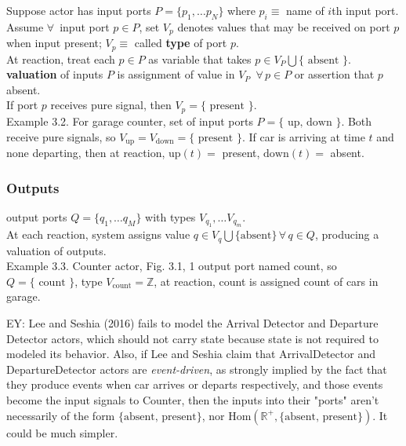 \documentclass[10pt]{amsart}
\begin{document}
\begin{multicols*}{2}
Suppose actor has input ports $P = \lbrace p_1, \dots p_N \rbrace$ where $p_i \equiv $ name of $i$th input port. \\

Assume $\forall \, $ input port $p\in P$, set $V_p$ denotes values that may be received on port $p$ when input present; $V_p \equiv$ called \textbf{type} of port $p$. \\
At reaction, treat each $p \in P$ as variable that takes $p\in V_P \bigcup \lbrace \text{ absent } \rbrace$. \\
\textbf{valuation} of inputs $P$ is assignment of value in $V_P$\, $\forall \, p \in P$ or assertion that $p$ absent. \\
If port $p$ receives pure signal, then $V_p = \lbrace \text{ present } \rbrace$. \\

Example 3.2. For garage counter, set of input ports $P = \lbrace \text{ up, down } \rbrace$. Both receive pure signals, so $V_{\text{up}} = V_{\text{down}} = \lbrace \text{ present } \rbrace$. If car is arriving at time $t$ and none departing, then at reaction, $\text{up}(t) = $ present, $\text{down}(t) = $ absent. \\

\subsubsection{Outputs}

output ports $Q = \lbrace q_1, \dots q_M \rbrace$ with types $V_{q_1}, \dots V_{q_m}$. \\
At each reaction, system assigns value $q\in V_q \bigcup \lbrace \text{absent} \rbrace \, \forall \, q \in Q$, producing a valuation of outputs. \\

Example 3.3. Counter actor, Fig. 3.1, 1 output port named count, so $Q = \lbrace \text{ count } \rbrace$, type $V_{\text{count}} = \mathbb{Z}$, at reaction, count is assigned count of cars in garage.

EY: Lee and Seshia (2016) \cite{LeSe2016} fails to model the Arrival Detector and Departure Detector actors, which should not carry state because state is not required to modeled its behavior. Also, if Lee and Seshia claim that ArrivalDetector and DepartureDetector actors are \emph{event-driven}, as strongly implied by the fact that they produce events when car arrives or departs respectively, and those events become the input signals to Counter, then the inputs into their "ports" aren't necessarily of the form $\lbrace \text{absent, present} \rbrace$, nor $\text{Hom}(\mathbb{R}^+, \lbrace \text{absent, present} \rbrace)$. It could be much simpler. 


\end{multicols*}
\end{document}
